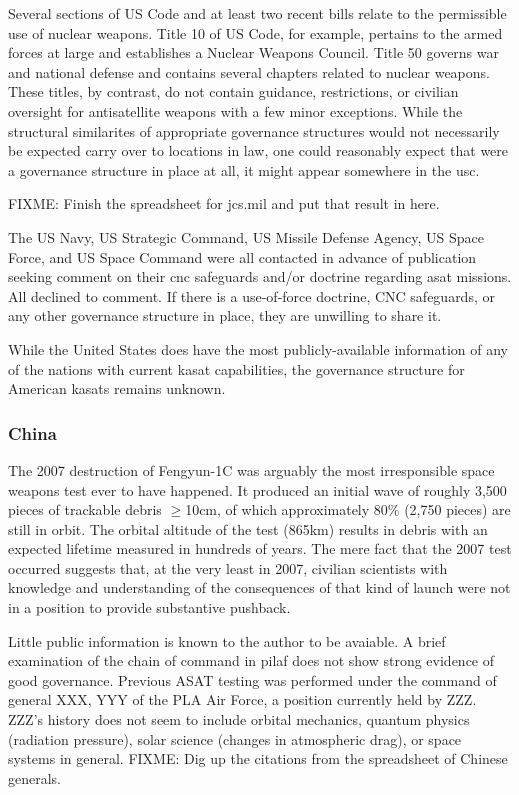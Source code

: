 Several sections of US Code and at least two recent bills relate to
the permissible use of nuclear weapons.  Title 10 of US Code, for
example, pertains to the armed forces at large and establishes a
Nuclear Weapons Council.  Title 50 governs war and national defense
and contains several chapters related to nuclear weapons.  These
titles, by contrast, do not contain guidance, restrictions, or
civilian oversight for antisatellite weapons with a few minor
exceptions.  While the structural similarites of appropriate
governance structures would not necessarily be expected carry over to
locations in law, one could reasonably expect that were a governance
structure in place at all, it might appear somewhere in the \acf{usc}.

FIXME: Finish the spreadsheet for jcs.mil and put that result in here.

The US Navy, US Strategic Command, US Missile Defense Agency, US Space
Force, and US Space Command were all contacted in advance of
publication seeking comment on their \ac{cnc} safeguards and/or
doctrine regarding \ac{asat} missions.  All declined to comment.  If
there is a use-of-force doctrine, CNC safeguards, or any other
governance structure in place, they are unwilling to share it.

While the United States does have the most publicly-available
information of any of the nations with current \ac{kasat}
capabilities, the governance structure for American \acp{kasat}
remains unknown.


\subsubsection{China}

The 2007 destruction of Fengyun-1C was arguably the most irresponsible
space weapons test ever to have happened.  It produced an initial wave
of roughly 3,500 pieces of trackable debris $\ge$10cm, of which
approximately 80\% (2,750 pieces) are still in
orbit.\cite[p05-01]{brian} The orbital altitude of the test (865km)
results in debris with an expected lifetime measured in hundreds of
years.\cite[fig from SpaceX]{rando-orbit} The mere fact that the 2007
test occurred suggests that, at the very least in 2007, civilian
scientists with knowledge and understanding of the consequences of
that kind of launch were not in a position to provide substantive
pushback.

Little public information is known to the author to be avaiable.  A
brief examination of the chain of command in \ac{pilaf} does not show
strong evidence of good governance.  Previous ASAT testing was
performed under the command of general XXX, YYY of the PLA Air Force,
a position currently held by ZZZ.  ZZZ's history does not seem to
include orbital mechanics, quantum physics (radiation pressure), solar
science (changes in atmospheric drag), or space systems in general.
FIXME: Dig up the citations from the spreadsheet of Chinese generals.

